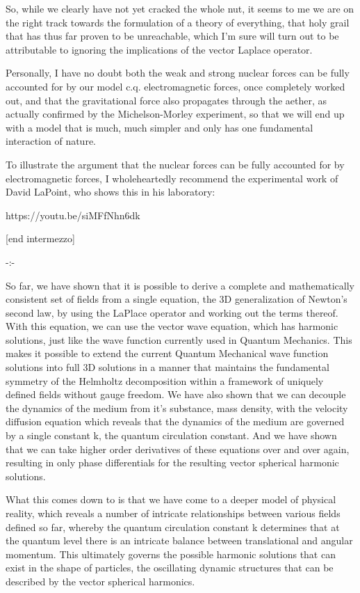 \documentclass{article}
\begin{document}
So, while we clearly have not yet cracked the whole nut, it seems to me we are on the right track towards the
formulation of a {\textquotedbl}theory of everything{\textquotedbl}, that holy grail that has thus far proven to be
unreachable, which I'm sure will turn out to be attributable to ignoring the implications of the vector Laplace
operator.

Personally, I have no doubt both the weak and strong nuclear forces can be fully accounted for by our model c.q.
electromagnetic forces, once completely worked out, and that the gravitational force also propagates through the
aether, as actually confirmed by the Michelson-Morley experiment, so that we will end up with a model that is much,
much simpler and only has one fundamental interaction of nature. 

To illustrate the argument that the nuclear forces can be fully accounted for by electromagnetic forces, I
wholeheartedly recommend the experimental work of David LaPoint, who shows this in his laboratory:

https://youtu.be/siMFfNhn6dk  

[end intermezzo]

{}-:-

So far, we have shown that it is possible to derive a complete and mathematically consistent set of fields from a single
equation, the 3D generalization of Newton's second law, by using the LaPlace operator and working out the terms
thereof. With this equation, we can use the vector wave equation, which has harmonic solutions, just like the wave
function currently used in Quantum Mechanics. This makes it possible to extend the current Quantum Mechanical wave
function solutions into full 3D solutions in a manner that maintains the fundamental symmetry of the Helmholtz
decomposition within a framework of uniquely defined fields without gauge freedom. We have also shown that we can
decouple the dynamics of the medium from it's substance, mass density, with the velocity diffusion equation which
reveals that the dynamics of the medium are governed by a single constant k, the quantum circulation constant. And we
have shown that we can take higher order derivatives of these equations over and over again, resulting in only phase
differentials for the resulting vector spherical harmonic solutions.

What this comes down to is that we have come to a deeper model of physical reality, which reveals a number of intricate
relationships between various fields defined so far, whereby the quantum circulation constant k determines that at the
quantum level there is an intricate balance between translational and angular momentum. This ultimately governs the
possible harmonic solutions that can exist in the shape of particles, the oscillating dynamic structures that can be
described by the vector spherical harmonics.  
\end{document}
